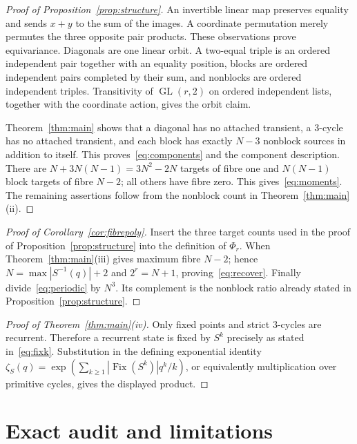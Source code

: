 \documentclass[a4paper,10pt]{amsart}
\theoremstyle{remark}
\newcommand{\Fix}{\operatorname{Fix}}
\begin{document}
\begin{proof}[Proof of Proposition~\ref{prop:structure}]
An invertible linear map preserves equality and sends $x+y$ to the sum of
the images.  A coordinate permutation merely permutes the three opposite
pair products.  These observations prove equivariance.  Diagonals are one
linear orbit.  A two-equal triple is an ordered independent pair together
with an equality position, blocks are ordered independent pairs completed by
their sum, and nonblocks are ordered independent triples.  Transitivity of
$\operatorname{GL}(r,2)$ on ordered independent lists, together with the
coordinate action, gives the orbit claim.

Theorem~\ref{thm:main} shows that a diagonal has no attached transient, a
$3$-cycle has no attached transient, and each block has exactly $N-3$
nonblock sources in addition to itself.  This proves~\eqref{eq:components}
and the component description.  There are $N+3N(N-1)=3N^2-2N$ targets of
fibre one and $N(N-1)$ block targets of fibre $N-2$; all others have fibre
zero.  This gives~\eqref{eq:moments}.  The remaining assertions follow from
the nonblock count in Theorem~\ref{thm:main}(ii).
\end{proof}

\begin{proof}[Proof of Corollary~\ref{cor:fibrepoly}]
Insert the three target counts used in the proof of
Proposition~\ref{prop:structure} into the definition of $\Phi_r$.  When
Theorem~\ref{thm:main}(iii) gives maximum fibre $N-2$; hence
$N=\max|S^{-1}(q)|+2$ and $2^r=N+1$, proving~\eqref{eq:recover}.  Finally
divide~\eqref{eq:periodic} by $N^3$.  Its complement is the nonblock ratio
already stated in Proposition~\ref{prop:structure}.
\end{proof}

\begin{proof}[Proof of Theorem~\ref{thm:main}(iv)]
Only fixed points and strict $3$-cycles are recurrent.  Therefore a recurrent
state is fixed by $S^k$ precisely as stated in~\eqref{eq:fixk}.  Substitution
in the defining exponential identity
$\zeta_S(q)=\exp(\sum_{k\ge1}|\Fix(S^k)|q^k/k)$, or equivalently multiplication
over primitive cycles, gives the displayed product.
\end{proof}

\section{Exact audit and limitations}\label{sec:audit}
\end{document}

